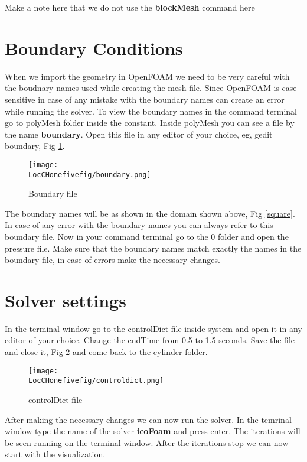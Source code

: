 \flushleft Make a note here that we do not use the \textbf{blockMesh} command here

\section{Boundary Conditions}

When we import the geometry in OpenFOAM we need to be very careful with the boudnary names used while creating the mesh file. Since OpenFOAM is case
sensitive in case of any mistake with the boundary names can create an error while running the solver. To view the boundary names in the command terminal
go to polyMesh folder inside the constant. Inside polyMesh you can see a file by the name \textbf{boundary}. Open this file in any editor of your
choice, eg, gedit boundary, Fig \ref{boundary}.

\begin{figure}[h]  
\centering
\texttt{[image: \\LocCHonefivefig/boundary.png]}
\caption{Boundary file}
\label{boundary}
\end{figure}

\flushleft The boundary names will be as shown in the domain shown above, Fig \ref{square}. In case of any error with the boundary names you can
always refer to this boundary file. Now in your command terminal go to the 0 folder and open the pressure file. Make sure that the boundary names 
match exactly the names in the boundary file, in case of errors make the necessary changes.

\section{Solver settings}

In the terminal window go to the controlDict file inside system and open it in any editor of your choice. Change the endTime from 0.5 to 1.5 seconds.
Save the file and close it, Fig \ref{cd} and come back to the cylinder folder.

\begin{figure}[h]  
\centering
\texttt{[image: \\LocCHonefivefig/controldict.png]}
\caption{controlDict file}
\label{cd}
\end{figure}

\flushleft After making the necessary changes we can now run the solver. In the temrinal window type the name of the solver \textbf{icoFoam}
and press enter. The iterations will be seen running on the terminal window. After the iterations stop we can now start with the visualization.

